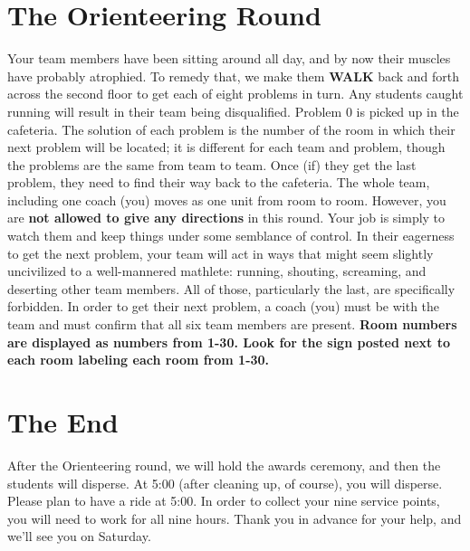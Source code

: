 \documentclass[11pt]{article}
\begin{document}
\begin{small}
\section{The Orienteering Round}
\noindent Your team members have been sitting around all day, and by now their muscles have probably atrophied. To remedy that, we make them \textbf{WALK} back and forth across the second floor to get each of eight problems in turn. Any students caught running will result in their team being disqualified. Problem 0 is picked up in the cafeteria. The solution of each problem is the number of the room in which their next problem will be located; it is different for each team and problem, though the problems are the same from team to team. Once (if) they get the last problem, they need to find their way back to the cafeteria. The whole team, including one coach (you) moves as one unit from room to room. However, you are \textbf{not allowed to give any directions} in this round.  Your job is simply to watch them and keep things under some semblance of control.  In their eagerness to get the next problem, your team will act in ways that might seem slightly uncivilized to a well-mannered mathlete: running, shouting, screaming, and deserting other team members. All of those, particularly the last, are specifically forbidden. In order to get their next problem, a coach (you) must be with the team and must confirm that all six team members are present. \textbf{Room numbers are displayed as numbers from 1-30. Look for the sign posted next to each room labeling each room from 1-30.}

\section{The End}
\noindent After the Orienteering round, we will hold the awards ceremony, and then the students will disperse. At 5:00 (after cleaning up, of course), you will disperse. Please plan to have a ride at 5:00. In order to collect your nine service points, you will need to work for all nine hours. Thank you in advance for your help, and we'll see you on Saturday.

\end{small}	
\end{document}
